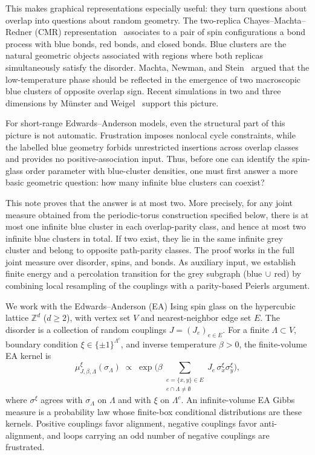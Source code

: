 \documentclass[11pt]{article}
\numberwithin{theorem}{section}
\theoremstyle{remark}
\begin{document}
This makes graphical representations especially useful: they turn questions about overlap into questions about random geometry.
The two-replica Chayes--Machta--Redner (CMR) representation~\cite{CMR1998} associates to a pair of spin configurations a bond process with blue bonds, red bonds, and closed bonds.
Blue clusters are the natural geometric objects associated with regions where both replicas simultaneously satisfy the disorder.
Machta, Newman, and Stein~\cite{MNS2007} argued that the low-temperature phase should be reflected in the emergence of two macroscopic blue clusters of opposite overlap sign.
Recent simulations in two and three dimensions by M\"unster and Weigel~\cite{MW2023,MW2025} support this picture.

For short-range Edwards--Anderson models, even the structural part of this picture is not automatic.
Frustration imposes nonlocal cycle constraints, while the labelled blue geometry forbids unrestricted insertions across overlap classes and provides no positive-association input.
Thus, before one can identify the spin-glass order parameter with blue-cluster densities, one must first answer a more basic geometric question: how many infinite blue clusters can coexist?

This note proves that the answer is at most two.
More precisely, for any joint measure obtained from the periodic-torus construction specified below, there is at most one infinite blue cluster in each overlap-parity class, and hence at most two infinite blue clusters in total.
If two exist, they lie in the same infinite grey cluster and belong to opposite path-parity classes.
The proof works in the full joint measure over disorder, spins, and bonds. As auxiliary input, we establish finite energy and a percolation transition for the grey subgraph (blue$\,\cup\,$red) by combining local resampling of the couplings with a parity-based Peierls argument.

We work with the Edwards--Anderson (EA) Ising spin glass on the hypercubic lattice $\mathbb{Z}^d$ ($d \geq 2$), with vertex set $V$ and nearest-neighbor edge set $E$. The disorder is a collection of random couplings $J = (J_e)_{e \in E}$. For a finite $\Lambda\subset V$, boundary condition $\xi\in\{\pm1\}^{\Lambda^c}$, and inverse temperature $\beta>0$, the finite-volume EA kernel is
\begin{equation}\label{eq:gibbs}
  \mu_{J,\beta,\Lambda}^{\xi}(\sigma_\Lambda)
  \;\propto\;
  \exp\Biggl(\beta
    \sum_{\substack{e=\{x,y\}\in E\\ e\cap\Lambda\neq\emptyset}}
      J_e\,\sigma_x^\xi\sigma_y^\xi\Biggr),
\end{equation}
where $\sigma^\xi$ agrees with $\sigma_\Lambda$ on $\Lambda$ and with $\xi$ on $\Lambda^c$.
An infinite-volume EA Gibbs measure is a probability law whose finite-box conditional distributions are these kernels.
Positive couplings favor alignment, negative couplings favor anti-alignment, and loops carrying an odd number of negative couplings are frustrated.
\end{document}
